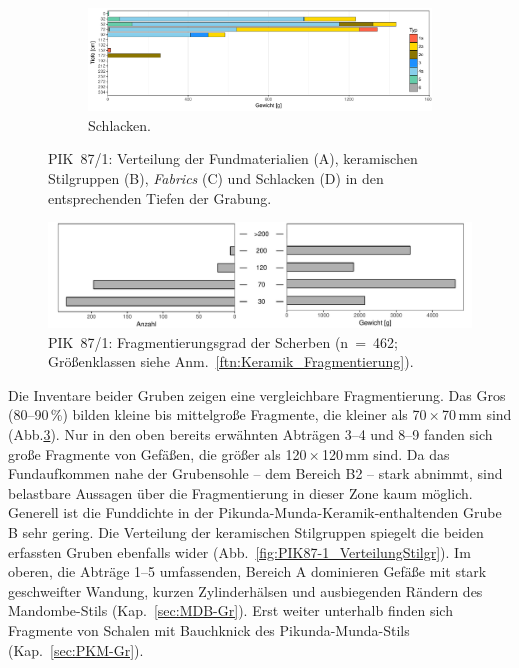 \begin{figure}[p]
\begin{subfigure}{\textwidth}
		\centering
		\includegraphics[width = \textwidth]{fig/9-8_PIK87-1_Schlacken_R.pdf}
		\caption{Schlacken.}
		\label{fig:PIK87-1_Schlacken}
	\end{subfigure}
	\caption{PIK~87/1: Verteilung der Fundmaterialien (A), keramischen Stilgruppen (B), \textit{Fabrics} (C) und Schlacken (D) in den entsprechenden Tiefen der Grabung.}
	\label{fig:PIK87-1_KeramikVerteilung}
\end{figure}

\begin{figure}[tb!]
	\centering
	\includegraphics[width=\textwidth]{fig/9-08_PIK87-1_Fragmentierung_2.pdf}
	\caption{PIK~87/1: Fragmentierungsgrad der Scherben (n~=~462; Größenklassen siehe Anm.~\ref{ftn:Keramik_Fragmentierung}).}
	\label{fig:PIK87-1_Fragmentierung}
\end{figure}

Die Inventare beider Gruben zeigen eine vergleichbare Fragmentierung. Das Gros (80--90\,\%) bilden kleine bis mittelgroße Fragmente, die kleiner als 70\,$\times$\,70\,mm sind (Abb.\ref{fig:PIK87-1_Fragmentierung}). Nur in den oben bereits erwähnten Abträgen 3--4 und 8--9 fanden sich große Fragmente von Gefäßen, die größer als 120\,$\times$\,120\,mm sind. Da das Fundaufkommen nahe der Grubensohle -- dem Bereich B2 -- stark abnimmt, sind belastbare Aussagen über die Fragmentierung in dieser Zone kaum möglich. Generell ist die Funddichte in der Pikunda-Munda-Keramik-enthaltenden Grube B sehr gering. Die Verteilung der keramischen Stilgruppen spiegelt die beiden erfassten Gruben ebenfalls wider (Abb.~\ref{fig:PIK87-1_VerteilungStilgr}). Im oberen, die Abträge 1--5 umfassenden, Bereich A dominieren Gefäße mit stark geschweifter Wandung, kurzen Zylinderhälsen und ausbiegenden Rändern des Mandombe-Stils (Kap.~\ref{sec:MDB-Gr}). Erst weiter unterhalb finden sich Fragmente von Schalen mit Bauchknick des Pikunda-Munda-Stils (Kap.~\ref{sec:PKM-Gr}). 

